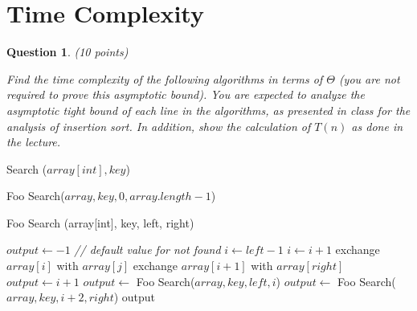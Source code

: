 \documentclass[a4paper]{article}
\theoremstyle{remarksStyle}
\theoremstyle{questionStyle}
\newtheorem{question}{Question}
\theoremstyle{answerStyle}
\begin{document}
\vspace{2cm}

\section{Time Complexity}
\begin{question} (10 points)
    
Find the time complexity of the following algorithms in terms of $\Theta$ (you are not required to prove this asymptotic bound).
You are expected to analyze the asymptotic tight bound of each line in the algorithms, as presented in class for the analysis of insertion sort. 
In addition, show the calculation of $T(n)$ as done in the lecture.
\end{question}


\begin{algorithm}[H]\caption{Search ($array[int], key$)}
 \begin{algorithmic}[1]
  \RETURN   Foo Search($array, key, 0, array.length -1$) 
  \end{algorithmic} 
\end{algorithm} 



\begin{algorithm}[H]
  \caption{Foo Search (array[int], key, left, right)}
  \begin{algorithmic}[1]
    \STATE $output \gets -1$ \quad \textit{// default value for not found}
    \STATE  $i \gets left - 1$
              \STATE $i \gets i+1$
              \STATE exchange $array[i]$ with $array[j]$
          \ENDIF
      \ENDFOR  
      \STATE exchange $array[i+1]$ with $array[right]$
          \STATE  $output \gets i+1$
         \STATE  $output \gets$  Foo Search($array, key, left, i$)
      \ELSE
          \STATE $output \gets$    Foo Search($array, key, i+2, right$)
      \ENDIF
    \ENDIF
    \RETURN output
  \end{algorithmic} 
\end{algorithm} 



\newpage
\end{document}
